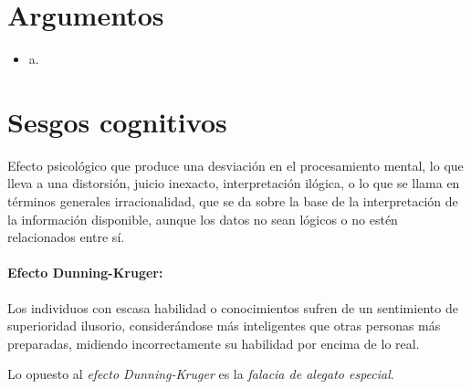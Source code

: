 \documentclass[12pt,a4paper,openbib]{article}
\begin{document}
	\section{Argumentos}
	
	\begin{itemize}
		\item a.
	\end{itemize}
	
	\section{Sesgos cognitivos}
	
	Efecto psicológico que produce una desviación en el procesamiento mental, lo que lleva a una distorsión, juicio inexacto, interpretación ilógica, o lo que se llama en términos generales irracionalidad, que se da sobre la base de la interpretación de la información disponible, aunque los datos no sean lógicos o no estén relacionados entre sí.
	
	\paragraph{Efecto Dunning-Kruger:} Los individuos con escasa habilidad o conocimientos sufren de un sentimiento de superioridad ilusorio, considerándose más inteligentes que otras personas más preparadas, midiendo incorrectamente su habilidad por encima de lo real.
	
	Lo opuesto al \emph{efecto Dunning-Kruger} es la \emph{falacia de alegato especial}.
\end{document}
